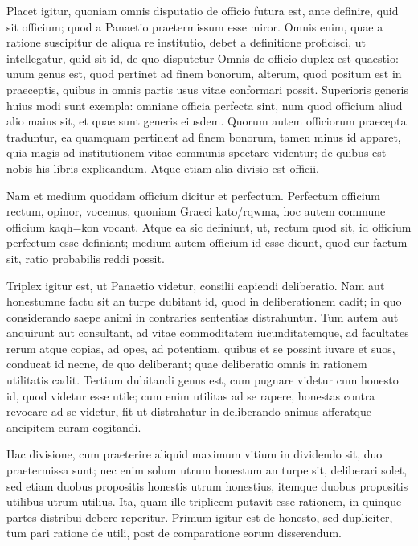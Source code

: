  Placet igitur, quoniam omnis disputatio de officio futura est, ante definire, quid sit officium; quod a Panaetio praetermissum esse miror. Omnis enim, quae a ratione suscipitur de aliqua re institutio, debet a definitione proficisci, ut intellegatur, quid sit id, de quo disputetur Omnis de officio duplex est quaestio: unum genus est, quod pertinet ad finem bonorum, alterum, quod positum est in praeceptis, quibus in omnis partis usus vitae conformari possit. Superioris generis huius modi sunt exempla: omniane officia perfecta sint, num quod officium aliud alio maius sit, et quae sunt generis eiusdem. Quorum autem officiorum praecepta traduntur, ea quamquam pertinent ad finem bonorum, tamen minus id apparet, quia magis ad institutionem vitae communis spectare videntur; de quibus est nobis his libris explicandum. Atque etiam alia divisio est officii.

 Nam et medium quoddam officium dicitur et perfectum. Perfectum officium rectum, opinor, vocemus, quoniam Graeci kato/rqwma, hoc autem commune officium kaqh=kon vocant. Atque ea sic definiunt, ut, rectum quod sit, id officium perfectum esse definiant; medium autem officium id esse dicunt, quod cur factum sit, ratio probabilis reddi possit.

 Triplex igitur est, ut Panaetio videtur, consilii capiendi deliberatio. Nam aut honestumne factu sit an turpe dubitant id, quod in deliberationem cadit; in quo considerando saepe animi in contraries sententias distrahuntur. Tum autem aut anquirunt aut consultant, ad vitae commoditatem iucunditatemque, ad facultates rerum atque copias, ad opes, ad potentiam, quibus et se possint iuvare et suos, conducat id necne, de quo deliberant; quae deliberatio omnis in rationem utilitatis cadit. Tertium dubitandi genus est, cum pugnare videtur cum honesto id, quod videtur esse utile; cum enim utilitas ad se rapere, honestas contra revocare ad se videtur, fit ut distrahatur in deliberando animus afferatque ancipitem curam cogitandi.

 Hac divisione, cum praeterire aliquid maximum vitium in dividendo sit, duo praetermissa sunt; nec enim solum utrum honestum an turpe sit, deliberari solet, sed etiam duobus propositis honestis utrum honestius, itemque duobus propositis utilibus utrum utilius. Ita, quam ille triplicem putavit esse rationem, in quinque partes distribui debere reperitur. Primum igitur est de honesto, sed dupliciter, tum pari ratione de utili, post de comparatione eorum disserendum.

